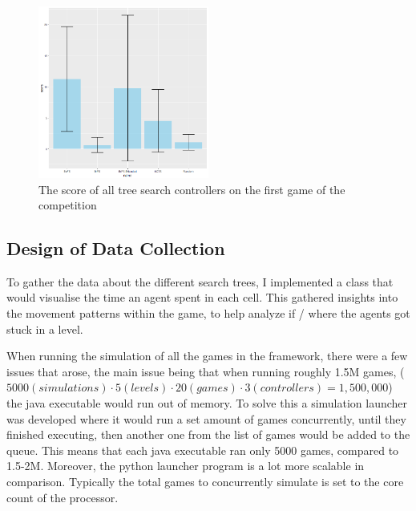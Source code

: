 \documentclass[journal]{IEEEtran}
\begin{document}
		\begin{figure}[h]
		    \centering
		    \includegraphics[width=0.5\textwidth]{treeSearchComparison_0}
		    \caption{ The score of all tree search controllers on the first game of the competition }
		    \label{fig:game0Means}
		\end{figure}
		
	
	



	\subsection{Design of Data Collection}
	
	To gather the data about the different search trees, I implemented a class that would visualise the time an agent spent in each cell. 
	This gathered insights into the movement patterns within the game, to help analyze if / where the agents got stuck in a level.
	
	When running the simulation of all the games in the framework, there were a few issues that arose, the main issue being that when running roughly 1.5M games, ($ 5000(simulations) \cdot 5 (levels) \cdot 20 (games) \cdot 3 (controllers) = 1,500,000$) the java executable would run out of memory.
	To solve this a simulation launcher was developed where it would run a set amount of games concurrently, until they finished executing, then another one from the list of games would be added to the queue. This means that each java executable ran only 5000 games, compared to 1.5-2M. Moreover, the python launcher program is a lot more scalable in comparison.
	Typically the total games to concurrently simulate is set to the core count of the processor.
\end{document}
